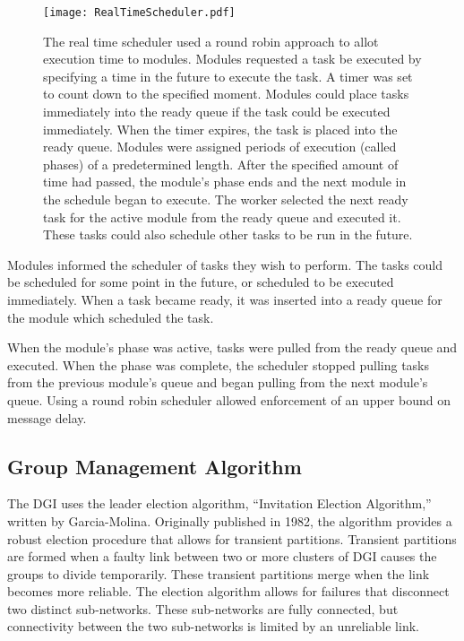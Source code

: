 \begin{figure}[!h]
\centering
\texttt{[image: RealTimeScheduler.pdf]}
\captionsetup{singlelinecheck=off}
\caption[Real time scheduler]{The real time scheduler used a round robin approach to allot execution time to modules.
\raisebox{.5pt}{\textcircled{\raisebox{-.9pt} {1}}} Modules requested a task be executed by specifying a time in the future to execute the task.
\raisebox{.5pt}{\textcircled{\raisebox{-.9pt} {2}}} A timer was set to count down to the specified moment. 
Modules could place tasks immediately into the ready queue if the task could be executed immediately.
\raisebox{.5pt}{\textcircled{\raisebox{-.9pt} {3}}} When the timer expires, the task is placed into the ready queue.
\raisebox{.5pt}{\textcircled{\raisebox{-.9pt} {4}}} Modules were assigned periods of execution (called phases) of a predetermined length.
After the specified amount of time had passed, the module's phase ends and the next module in the schedule began to execute.
\raisebox{.5pt}{\textcircled{\raisebox{-.9pt} {5}}} The worker selected the next ready task for the active module from the ready queue and executed it.
These tasks could also schedule other tasks to be run in the future.
}
\label{fig:REALTIMESCHEDULER}
\end{figure}

Modules informed the scheduler of tasks they wish to perform.
The tasks could be scheduled for some point in the future, or scheduled to be executed immediately.
When a task became ready, it was inserted into a ready queue for the module which scheduled the task.

When the module's phase was active, tasks were pulled from the ready queue and executed.
When the phase was complete, the scheduler stopped pulling tasks from the previous module's queue and began pulling from the next module's queue.
Using a round robin scheduler allowed enforcement of an upper bound on message delay.

\subsection{Group Management Algorithm}

The DGI uses the leader election algorithm, ``Invitation Election Algorithm,'' written by Garcia-Molina\cite{INVITATIONELECTION}.
Originally published in 1982, the algorithm provides a robust election procedure that allows for transient partitions.
Transient partitions are formed when a faulty link between two or more clusters of \ac{DGI} causes the groups to divide temporarily.
These transient partitions merge when the link becomes more reliable.
The election algorithm allows for failures that disconnect two distinct sub-networks.
These sub-networks are fully connected, but connectivity between the two sub-networks is limited by an unreliable link.

